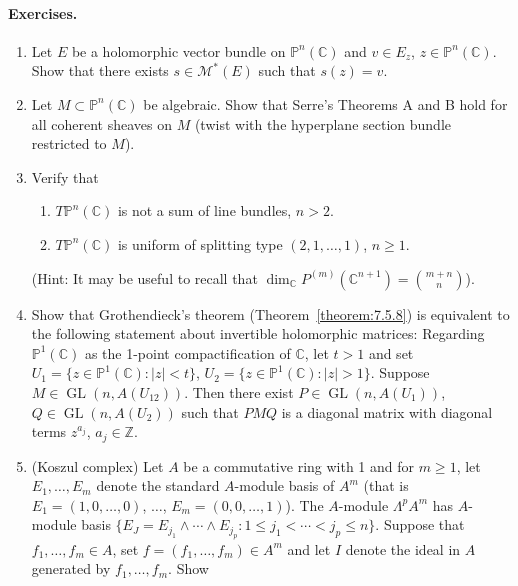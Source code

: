 \paragraph{Exercises.}
\begin{enumerate}
\item Let $E$ be a holomorphic vector bundle on $\mathbb{P}^n(\mathbb{C})$ and $v\in E_z$, $z\in\mathbb{P}^n(\mathbb{C})$. Show that there exists $s\in \mathcal{M}^*(E)$ such that $s(z)=v$.
\item Let $M\subset\mathbb{P}^n(\mathbb{C})$ be algebraic. Show that Serre's Theorems A and B hold for all coherent sheaves on $M$ (twist with the hyperplane section bundle restricted to $M$).
\item Verify that
\begin{enumerate}
\item $T\mathbb{P}^n(\mathbb{C})$ is not a sum of line bundles, $n>2$.
\item $T\mathbb{P}^n(\mathbb{C})$ is uniform of splitting type $(2,1,\ldots,1)$, $n\geq1$.
\end{enumerate}
(Hint: It may be useful to recall that $\dim_{\mathbb{C}}P^{(m)}(\mathbb{C}^{n+1})=\binom{m+n}{n}$).
\item Show that Grothendieck's theorem (Theorem~\ref{theorem:7.5.8}) is equivalent to the following statement about invertible holomorphic matrices: Regarding $\mathbb{P}^1(\mathbb{C})$ as the 1-point compactification of $\mathbb{C}$, let $t>1$ and set $U_1=\{z\in\mathbb{P}^1(\mathbb{C}):|z|<t\}$, $U_2=\{z\in\mathbb{P}^1(\mathbb{C}):|z|>1\}$. Suppose $M\in\operatorname{GL}(n,A(U_{12}))$. Then there exist $P\in\operatorname{GL}(n,A(U_1))$, $Q\in\operatorname{GL}(n,A(U_2))$ such that $PMQ$ is a diagonal matrix with diagonal terms $z^{a_j}$, $a_j\in\mathbb{Z}$.
\item (Koszul complex) Let $A$ be a commutative ring with 1 and for $m\geq1$, let $E_1,\ldots,E_m$ denote the standard $A$-module basis of $A^m$ (that is $E_1=(1,0,\ldots,0)$, $\ldots$, $E_m=(0,0,\ldots,1)$). The $A$-module $\Lambda^p A^m$ has $A$-module basis $\{E_J=E_{j_1}\wedge\cdots\wedge E_{j_p}:1\leq j_1<\cdots<j_p\leq n\}$. Suppose that $f_1,\ldots,f_m\in A$, set $f=(f_1,\ldots,f_m)\in A^m$ and let $I$ denote the ideal in $A$ generated by $f_1,\ldots,f_m$. Show

\end{enumerate}
